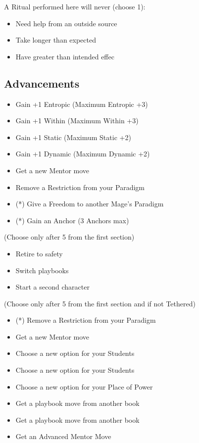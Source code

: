 \documentclass[
  oneside,
  statementpaper,
  9pt]{memoir}
\begin{document}
A Ritual performed here will never (choose 1):

\begin{itemize}
\tightlist
\item
  Need help from an outside source
\item
  Take longer than expected
\item
  Have greater than intended effec
\end{itemize}

\hypertarget{advancements-3}{%
\subsection{Advancements}\label{advancements-3}}

\begin{itemize}
\tightlist
\item
  Gain +1 Entropic (Maximum Entropic +3)
\item
  Gain +1 Within (Maximum Within +3)
\item
  Gain +1 Static (Maximum Static +2)
\item
  Gain +1 Dynamic (Maximum Dynamic +2)
\item
  Get a new Mentor move
\item
  Remove a Restriction from your Paradigm
\item
  (*) Give a Freedom to another Mage's Paradigm
\item
  (*) Gain an Anchor (3 Anchors max)
\end{itemize}

(Choose only after 5 from the first section)

\begin{itemize}
\tightlist
\item
  Retire to safety
\item
  Switch playbooks
\item
  Start a second character
\end{itemize}

(Choose only after 5 from the first section and if not Tethered)

\begin{itemize}
\tightlist
\item
  (*) Remove a Restriction from your Paradigm
\item
  Get a new Mentor move
\item
  Choose a new option for your Students
\item
  Choose a new option for your Students
\item
  Choose a new option for your Place of Power
\item
  Get a playbook move from another book
\item
  Get a playbook move from another book
\item
  Get an Advanced Mentor Move
\end{itemize}
\end{document}

